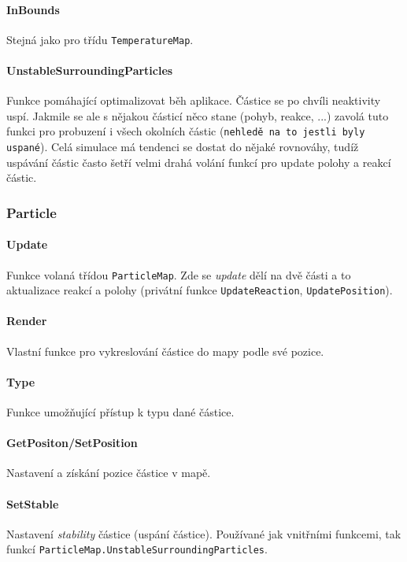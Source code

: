 \documentclass[a4paper, 12pt]{article}
\begin{document}
\paragraph{InBounds}
Stejná jako pro třídu \texttt{TemperatureMap}.

\paragraph{UnstableSurroundingParticles}
Funkce pomáhající optimalizovat běh aplikace. Částice se po chvíli neaktivity
uspí. Jakmile se ale s nějakou částicí něco stane (pohyb, reakce, ...) zavolá
tuto funkci pro probuzení i všech okolních částic (\texttt{nehledě na to jestli byly
uspané}). Celá simulace má tendenci se dostat do nějaké rovnováhy, tudíž
uspávání částic často šetří velmi drahá volání funkcí pro update polohy a
reakcí částic.

\subsubsection{Particle}
\paragraph{Update}
Funkce volaná třídou \texttt{ParticleMap}. Zde se \emph{update} dělí na dvě
části a to aktualizace reakcí a polohy (privátní funkce \texttt{UpdateReaction},
\texttt{UpdatePosition}). 

\paragraph{Render}
Vlastní funkce pro vykreslování částice do mapy podle své pozice.

\paragraph{Type}
Funkce umožňující přístup k typu dané částice.

\paragraph{GetPositon/SetPosition}
Nastavení a získání pozice částice v mapě.

\paragraph{SetStable}
Nastavení \emph{stability} částice (uspání částice). Používané jak vnitřními
funkcemi, tak funkcí \texttt{ParticleMap.UnstableSurroundingParticles}.
\end{document}
